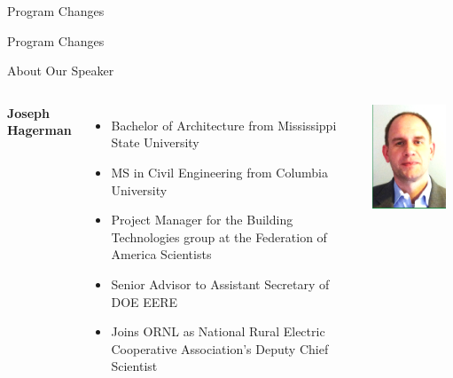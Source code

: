 \documentclass[handout]{beamer}
\begin{document}
\begin{frame}{Program Changes}
    \begin{center}
        {\color{acmblue}\Huge Program Changes}
    \end{center}
\end{frame}

\begin{frame}{About Our Speaker}
\begin{columns}
    \textbf{Joseph Hagerman}
    \begin{itemize}
        \item Bachelor of Architecture from Mississippi State University
        \item MS in Civil Engineering from Columbia University
        \item Project Manager for the Building Technologies group at
            the Federation of America Scientists
        \item Senior Advisor to Assistant Secretary of DOE EERE
        \item Joins ORNL as National Rural Electric Cooperative Association's
            Deputy Chief Scientist
    \end{itemize}
    \includegraphics[width=0.9\textwidth]{hagerman}
\end{columns}
\end{frame}
\end{document}
